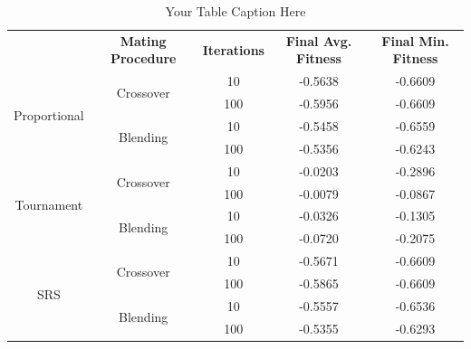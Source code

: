 \documentclass[10pt]{article}
\begin{document}
\begin{table}[H]
    \centering

    \begin{tabular}{|*{5}{c|}}
        \hline
        \renewcommand{\arraystretch}{1.5}
        \multirow{2}{*}{\textbf{Selection Method}} & \multirow{2}{*}{\textbf{Mating Procedure}} & \multirow{2}{*}{\textbf{Iterations}} & \multirow{2}{*}{\textbf{Final Avg. Fitness}} & \multirow{2}{*}{\textbf{Final Min. Fitness}} \\
        & & & & \\
        \hline
        \multirow{4}{*}{Proportional} & \multirow{2}{*}{Crossover} & 10 & -0.5638 & -0.6609 \\
        & &\cellcolor{lightgray} 100 &\cellcolor{lightgray} -0.5956 &\cellcolor{lightgray} -0.6609 \\
        \cline{2-5}
        & \multirow{2}{*}{Blending} & 10 & -0.5458 & -0.6559 \\
        & &\cellcolor{lightgray} 100 &\cellcolor{lightgray} -0.5356 & \cellcolor{lightgray} -0.6243 \\
        \hline
        \multirow{4}{*}{Tournament} & \multirow{2}{*}{Crossover} & 10 & -0.0203 & -0.2896 \\
        & &\cellcolor{lightgray} 100 &\cellcolor{lightgray} -0.0079 &\cellcolor{lightgray} -0.0867 \\
        \cline{2-5}
        & \multirow{2}{*}{Blending} & 10 & -0.0326 & -0.1305 \\
        & &\cellcolor{lightgray} 100 &\cellcolor{lightgray} -0.0720 &\cellcolor{lightgray} -0.2075 \\
        \hline
        \multirow{4}{*}{SRS} & \multirow{2}{*}{Crossover} & 10 & -0.5671 & -0.6609 \\
        & &\cellcolor{lightgray} 100 &\cellcolor{lightgray} -0.5865 &\cellcolor{lightgray} -0.6609 \\
        \cline{2-5}
        & \multirow{2}{*}{Blending} & 10 & -0.5557 & -0.6536 \\
        & &\cellcolor{lightgray} 100 &\cellcolor{lightgray} -0.5355 &\cellcolor{lightgray} -0.6293 \\
        \hline
    \end{tabular}
    \caption{Your Table Caption Here}
    \label{tab:mytable}
\end{table}
\end{document}
